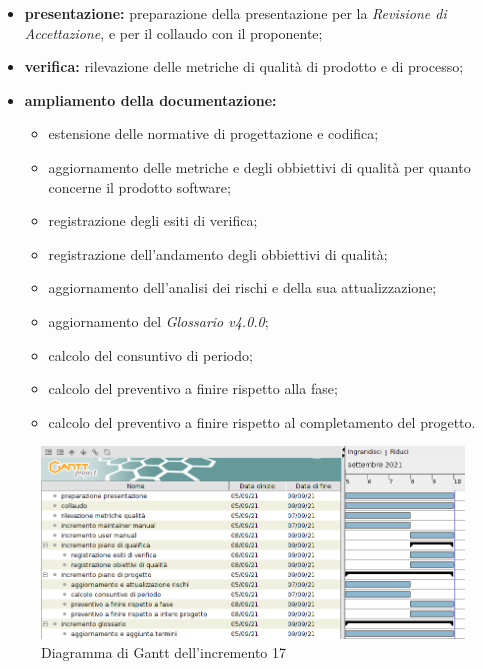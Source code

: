 \begin{itemize}
    \item \textbf{presentazione:} preparazione della presentazione per la \textit{Revisione di Accettazione}, e per il collaudo con il proponente;
    \item \textbf{verifica:} rilevazione delle metriche di qualità di prodotto e di processo;
    \item \textbf{ampliamento della documentazione:}
          \begin{itemize}
              \item estensione delle normative di progettazione e codifica;
              \item aggiornamento delle metriche e degli obbiettivi di qualità per quanto concerne il prodotto software;
              \item registrazione degli esiti di verifica;
              \item registrazione dell'andamento degli obbiettivi di qualità;
              \item aggiornamento dell'analisi dei rischi e della sua attualizzazione;
              \item aggiornamento del \textit{Glossario v4.0.0};
              \item calcolo del consuntivo di periodo;
              \item calcolo del preventivo a finire rispetto alla fase;
              \item calcolo del preventivo a finire rispetto al completamento del progetto.
          \end{itemize}
\end{itemize}
\pagebreak
{}
\begin{figure}[!ht]
    \caption{Diagramma di Gantt dell'incremento 17}
    \vspace{5px}
    \includegraphics[scale=0.3]{../../../Images/Diagrammi/Gantt/incremento17.png}
    \centering
\end{figure}


